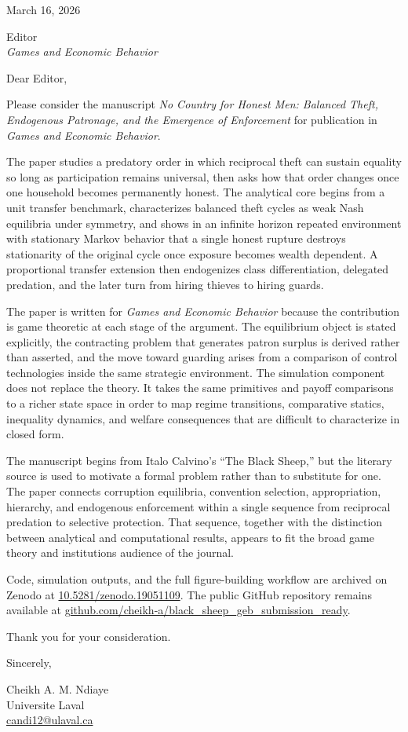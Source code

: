 \documentclass[12pt]{article}
\begin{document}
\thispagestyle{empty}
\onehalfspacing

March 16, 2026

Editor\\
\emph{Games and Economic Behavior}

Dear Editor,

Please consider the manuscript \emph{No Country for Honest Men: Balanced Theft, Endogenous Patronage, and the Emergence of Enforcement} for publication in \emph{Games and Economic Behavior}.

The paper studies a predatory order in which reciprocal theft can sustain equality so long as participation remains universal, then asks how that order changes once one household becomes permanently honest. The analytical core begins from a unit transfer benchmark, characterizes balanced theft cycles as weak Nash equilibria under symmetry, and shows in an infinite horizon repeated environment with stationary Markov behavior that a single honest rupture destroys stationarity of the original cycle once exposure becomes wealth dependent. A proportional transfer extension then endogenizes class differentiation, delegated predation, and the later turn from hiring thieves to hiring guards.

The paper is written for \emph{Games and Economic Behavior} because the contribution is game theoretic at each stage of the argument. The equilibrium object is stated explicitly, the contracting problem that generates patron surplus is derived rather than asserted, and the move toward guarding arises from a comparison of control technologies inside the same strategic environment. The simulation component does not replace the theory. It takes the same primitives and payoff comparisons to a richer state space in order to map regime transitions, comparative statics, inequality dynamics, and welfare consequences that are difficult to characterize in closed form.

The manuscript begins from Italo Calvino's ``The Black Sheep,'' but the literary source is used to motivate a formal problem rather than to substitute for one. The paper connects corruption equilibria, convention selection, appropriation, hierarchy, and endogenous enforcement within a single sequence from reciprocal predation to selective protection. That sequence, together with the distinction between analytical and computational results, appears to fit the broad game theory and institutions audience of the journal.

Code, simulation outputs, and the full figure-building workflow are archived on Zenodo at \href{https://doi.org/10.5281/zenodo.19051109}{10.5281/zenodo.19051109}. The public GitHub repository remains available at \href{https://github.com/cheikh-a/black_sheep_geb_submission_ready}{github.com/cheikh-a/black\_sheep\_geb\_submission\_ready}.

Thank you for your consideration.

Sincerely,

Cheikh A. M. Ndiaye\\
Universite Laval\\
\href{mailto:candi12@ulaval.ca}{candi12@ulaval.ca}
\end{document}
